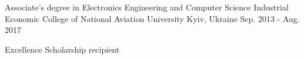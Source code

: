 

\begin{cventries}

  \cventry
    {Associate's degree in Electronics Engineering and Computer Science} %
    {Industrial Economic College of National Aviation University} %
    {Kyiv, Ukraine} %
    {Sep. 2013 - Aug. 2017} %
    {
        \begin{cvitems} %
          \item {Excellence Scholarship recipient}  
        \end{cvitems}
    }
      
\end{cventries}
